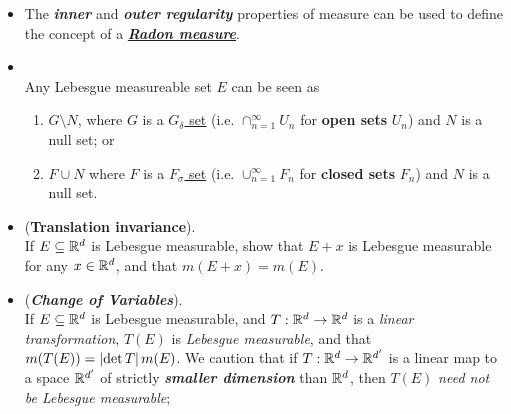 \documentclass[11pt]{article}
\begin{document}
\begin{itemize}
\begin{proof}
Suppose $m(E)<\infty$, we only need to show that $K$ is bounded, then for any $\epsilon>0$, there exists compact (i.e. closed and bounded set) $K$ such that  $m^{*}(E \setminus  K)\le \epsilon$, so $m(E)\le m^{*}(K)+ \epsilon$. Then $m(E)= \sup\limits_{K\subset E, \; K \text{ is compact}}m(K)$.

Clearly if $E$ is bounded, $K$ is bounded. If else, $E = E'\cup S$, where $E'$ is bounded with $S$ unbounded but $m(S)=0$. Then choose $K\subset E'$, then $K$ is bounded. That is, if $E$ is finite measureable, then $K$ is as required. This completes our proof. \qed
\end{proof}

\item \begin{remark}
The \emph{\textbf{inner}} and \emph{\textbf{outer regularity}} properties of measure can be used to define the concept of a \underline{\emph{\textbf{Radon measure}}}.
\end{remark}

\item \begin{proposition} \citep{tao2011introduction}\\
Any Lebesgue measureable set $E$ can be seen as
\begin{enumerate}
\item $G \setminus  N$, where $G$ is a \underline{$G_{\delta}$ set} (i.e. $\cap_{n=1}^{\infty}U_n$ for \textbf{open sets} $U_n$) and $N$ is a null set; or
\item $F\cup N$ where $F$ is a \underline{$F_{\sigma}$ set} (i.e.  $\cup_{n=1}^{\infty}F_n$ for \textbf{closed sets} $F_n$) and $N$ is a null set.
\end{enumerate}
\end{proposition}
 
\item \begin{proposition} (\textbf{Translation invariance}). \\
If $E \subseteq {\mathbb R}^d$ is Lebesgue measurable, show that $E + x$ is Lebesgue measurable for any $x \in {\mathbb R}^d$, and that $m(E + x) = m(E)$.
\end{proposition}



\item \begin{remark} (\emph{\textbf{Change of Variables}}). \\
If $E \subseteq {\mathbb R}^d$ is Lebesgue measurable, and $T: {\mathbb R}^d \rightarrow {\mathbb R}^d$ is a \emph{linear transformation}, $T(E)$ is \emph{Lebesgue measurable}, and that $m(T(E)) = \left\lvert \det{T} \right\rvert m(E)$. We caution that if $T: {\mathbb R}^d \rightarrow {\mathbb R}^{d'}$ is a linear map to a space ${\mathbb R}^{d'}$ of strictly \emph{\textbf{smaller dimension}} than ${\mathbb R}^d$, then $T(E)$ \emph{need not be Lebesgue measurable};
\end{remark}


\end{itemize}
\end{document}
